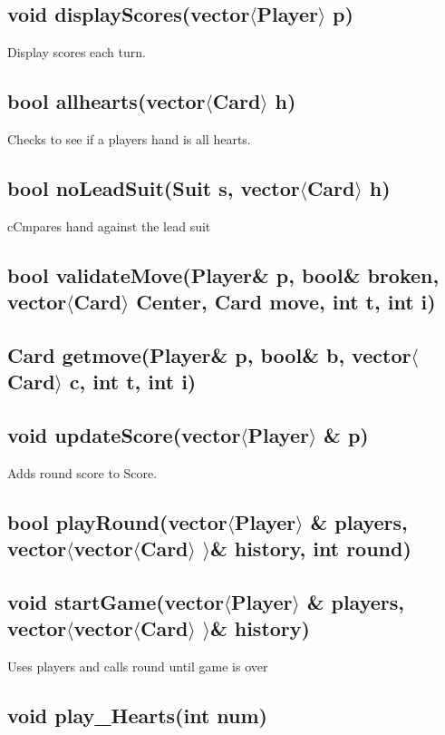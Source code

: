 \documentclass[]{scrartcl}
\begin{document}
\subsection{void displayScores(vector$\langle$Player$\rangle$  p)}
	Display scores each turn.
\subsection{bool allhearts(vector$\langle$Card$\rangle$ h)  }
	Checks to see if a players hand is all hearts.
\subsection{bool noLeadSuit(Suit s, vector$\langle$Card$\rangle$ h) }
	 cCmpares hand against the lead suit
\subsection{bool validateMove(Player\& p, bool\& broken, vector$\langle$Card$\rangle$  Center, Card move, int t, int i)}
\subsection{Card getmove(Player\& p, bool\& b, vector$\langle$Card$\rangle$  c, int t, int i)}
\subsection{void updateScore(vector$\langle$Player$\rangle$ \& p)}
	Adds round score to Score.
\subsection{bool playRound(vector$\langle$Player$\rangle$ \& players, vector$\langle$vector$\langle$Card$\rangle$ $\rangle$\& history, int round)}
\subsection{void startGame(vector$\langle$Player$\rangle$ \& players, vector$\langle$vector$\langle$Card$\rangle$ $\rangle$\& history) }
	 Uses players and calls round until game is over
\subsection{void play\_Hearts(int num)}
\end{document}
